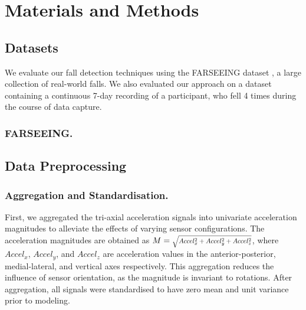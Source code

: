 \documentclass[runningheads]{llncs}
\newcommand{\inlineRoot}[1]{\scalebox{0.8}{$\sqrt{#1}$}}
\begin{document}

\section{Materials and Methods}

\subsection{Datasets}
We evaluate our fall detection techniques using the FARSEEING dataset \cite{klenk2016farseeing}, a large collection of real-world falls. We also evaluated our approach on a dataset containing a continuous 7-day recording of a participant, who fell 4 times during the course of data capture.

\subsubsection{FARSEEING.}

\subsection{Data Preprocessing}
\subsubsection{Aggregation and Standardisation.} First, we aggregated the tri-axial acceleration signals into univariate acceleration magnitudes to alleviate the effects of varying sensor configurations. The acceleration magnitudes are obtained as $M = \inlineRoot{Accel_x^2 + Accel_y^2 + Accel_z^2}$, where $Accel_x$, $Accel_y$, and $Accel_z$ are acceleration values in the anterior-posterior, medial-lateral, and vertical axes respectively. This aggregation reduces the influence of sensor orientation, as the magnitude is invariant to rotations. After aggregation, all signals were standardised to have zero mean and unit variance prior to modeling.
\end{document}
